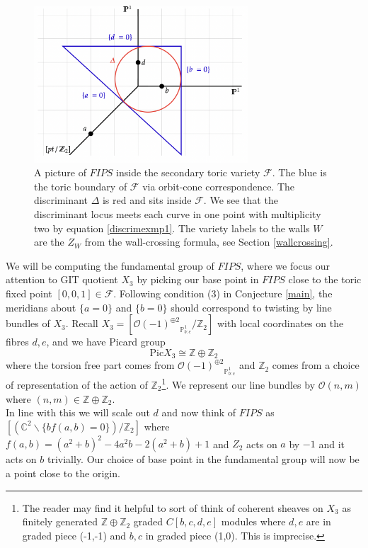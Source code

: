 \documentclass[oneside,reqno]{amsart}
\theoremstyle{definition}
\theoremstyle{definition}
\theoremstyle{definition}
\theoremstyle{definition}
\newcommand{\CC}{\mathbb{C}}
\newcommand{\PP}{\mathbb{P}}
\newcommand{\Z}{\mathbb{Z}}
\newcommand{\Fs}{\mathcal{F}}
\begin{document}
\begin{figure}[!h]
    \centering
    \includegraphics[width=8cm]{rank2exmp/secondarypolytope.png}
    \caption{A picture of $FIPS$ inside the secondary toric variety $\Fs$. The blue is the toric boundary of $\Fs$ via orbit-cone correspondence. The discriminant $\Delta$ is red and sits inside $\Fs$. We see that the discriminant locus meets each curve in one point with multiplicity two by equation \eqref{discrimexmp1}. The variety labels to the walls $W$ are the $Z_W$ from the wall-crossing formula, see Section \ref{wallcrossing}.}
\end{figure}
We will be computing the fundamental group of $FIPS$, where we focus our attention to GIT quotient $X_3$ by picking our base point in $FIPS$ close to the toric fixed point $[0,0,1]\in \Fs$. Following condition (3) in Conjecture \ref{main}, the meridians about $\{a=0 \}$ and $\{b = 0 \}$ should correspond to twisting by line bundles of $X_3$. Recall $X_3 = \left[{\mathcal{O}(-1)^{\oplus 2}}_{\PP^1_{b:c}} / \Z_2 \right]$ with local coordinates on the fibres $d,e$, and we have Picard group
\begin{equation}
\text{Pic} X_3 \cong \Z \oplus \Z_2
\label{picX3}
\end{equation}
where the torsion free part comes from ${\mathcal{O}(-1)^{\oplus 2}}_{\PP^1_{b:c}}$ and $\Z_2$ comes from a choice of representation of the action of $\Z_2$\footnote{The reader may find it helpful to sort of think of coherent sheaves on $X_3$ as finitely generated $\Z \oplus \Z_2$ graded $C[b,c,d,e]$ modules where $d,e$ are in graded piece (-1,-1) and $b,c$ in graded piece (1,0). This is imprecise.}. We represent our line bundles by $\mathcal{O} (n,m)$ where $(n,m) \in \Z \oplus \Z_2$. \\
\newline
In line with this we will scale out $d$ and now think of $FIPS$ as $\left[ (\CC^2 \backslash \{bf(a,b)=0\} ) / \Z_2 \right]$ where $f(a,b)=(a^2 + b )^2 -4a^2b -2(a^2 + b) +1$ and $Z_2$ acts on $a$ by $-1$ and it acts on $b$ trivially. Our choice of base point in the fundamental group will now be a point close to the origin.\\
\end{document}
